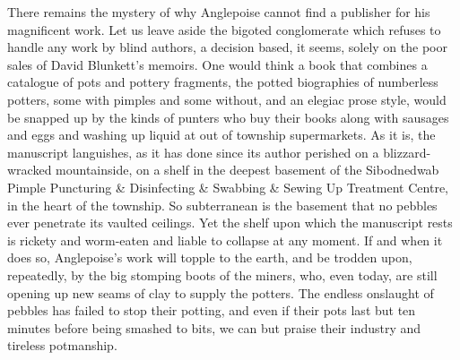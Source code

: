 There remains the mystery of why Anglepoise cannot find a publisher for his magnificent work. Let us leave aside the bigoted conglomerate which refuses to handle any work by blind authors, a decision based, it seems, solely on the poor sales of David Blunkett's memoirs. One would think a book that combines a catalogue of pots and pottery fragments, the potted biographies of numberless potters, some with pimples and some without, and an elegiac prose style, would be snapped up by the kinds of punters who buy their books along with sausages and eggs and washing up liquid at out of township supermarkets. As it is, the manuscript languishes, as it has done since its author perished on a blizzard-wracked mountainside, on a shelf in the deepest basement of the Sibodnedwab Pimple Puncturing \& Disinfecting \& Swabbing \& Sewing Up Treatment Centre, in the heart of the township. So subterranean is the basement that no pebbles ever penetrate its vaulted ceilings. Yet the shelf upon which the manuscript rests is rickety and worm-eaten and liable to collapse at any moment. If and when it does so, Anglepoise's work will topple to the earth, and be trodden upon, repeatedly, by the big stomping boots of the miners, who, even today, are still opening up new seams of clay to supply the potters. The endless onslaught of pebbles has failed to stop their potting, and even if their pots last but ten minutes before being smashed to bits, we can but praise their industry and tireless potmanship.